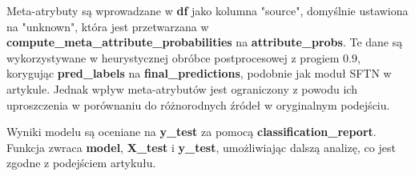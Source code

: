 Meta-atrybuty są wprowadzane w \textbf{df} jako kolumna "source", domyślnie ustawiona na "unknown", która jest przetwarzana w \textbf{compute\_meta\_attribute\_probabilities} na \textbf{attribute\_probs}. Te dane są wykorzystywane w heurystycznej obróbce postprocesowej z progiem 0.9, korygując \textbf{pred\_labels} na \textbf{final\_predictions}, podobnie jak moduł SFTN w artykule. Jednak wpływ meta-atrybutów jest ograniczony z powodu ich uproszczenia w porównaniu do różnorodnych źródeł w oryginalnym podejściu.

Wyniki modelu są oceniane na \textbf{y\_test} za pomocą \textbf{classification\_report}. Funkcja zwraca \textbf{model}, \textbf{X\_test} i \textbf{y\_test}, umożliwiając dalszą analizę, co jest zgodne z podejściem artykułu.